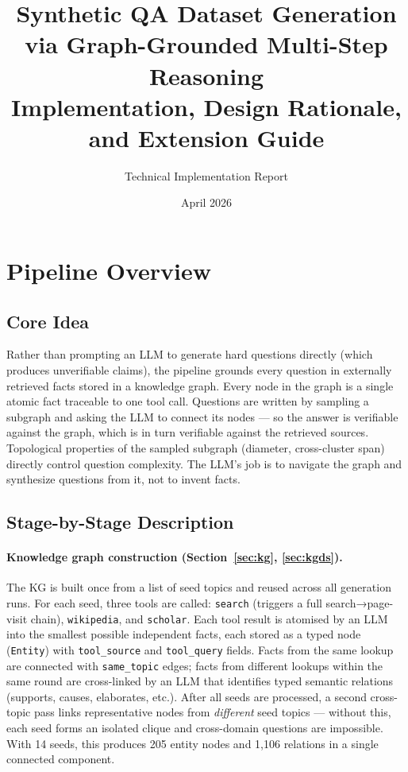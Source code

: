 \documentclass[11pt,a4paper]{article}
\title{\textbf{Synthetic QA Dataset Generation\\
via Graph-Grounded Multi-Step Reasoning}\\[0.4em]
\large Implementation, Design Rationale, and Extension Guide}
\author{Technical Implementation Report}
\date{April 2026}
\begin{document}
\maketitle
\tableofcontents
\newpage

\section{Pipeline Overview}

\subsection{Core Idea}

Rather than prompting an LLM to generate hard questions directly (which produces unverifiable claims), the pipeline grounds every question in externally retrieved facts stored in a knowledge graph. Every node in the graph is a single atomic fact traceable to one tool call. Questions are written by sampling a subgraph and asking the LLM to connect its nodes — so the answer is verifiable against the graph, which is in turn verifiable against the retrieved sources. Topological properties of the sampled subgraph (diameter, cross-cluster span) directly control question complexity. The LLM's job is to navigate the graph and synthesize questions from it, not to invent facts.

\subsection{Stage-by-Stage Description}

\paragraph{Knowledge graph construction (Section~\ref{sec:kg}, \ref{sec:kgds}).}
The KG is built once from a list of seed topics and reused across all generation runs. For each seed, three tools are called: \texttt{search} (triggers a full search→page-visit chain), \texttt{wikipedia}, and \texttt{scholar}. Each tool result is atomised by an LLM into the smallest possible independent facts, each stored as a typed node (\texttt{Entity}) with \texttt{tool\_source} and \texttt{tool\_query} fields. Facts from the same lookup are connected with \texttt{same\_topic} edges; facts from different lookups within the same round are cross-linked by an LLM that identifies typed semantic relations (supports, causes, elaborates, etc.). After all seeds are processed, a second cross-topic pass links representative nodes from \emph{different} seed topics --- without this, each seed forms an isolated clique and cross-domain questions are impossible. With 14 seeds, this produces 205 entity nodes and 1,106 relations in a single connected component.
\end{document}
